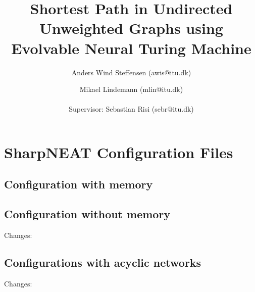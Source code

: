 \documentclass{article}
\author{Anders Wind Steffensen (awis@itu.dk)\and Mikael Lindemann (mlin@itu.dk)\\\\Supervisor: Sebastian Risi (sebr@itu.dk)}
\title{Shortest Path in Undirected Unweighted Graphs using Evolvable Neural Turing Machine}
\begin{document}

\maketitle
\tableofcontents
\listoftodos
\newpage







\clearpage


\newpage

\appendix
\section{SharpNEAT Configuration Files}
\label{appendix:sharpneat:configurations}
\subsection{Configuration with memory}


\subsection{Configuration without memory}
Changes:



\subsection{Configurations with acyclic networks}
Changes:


\end{document}

